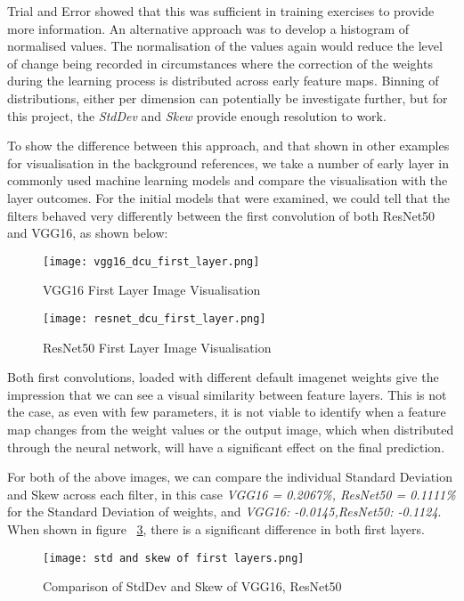 Trial and Error showed that this was sufficient in training exercises to provide more information. An alternative approach was to develop a histogram of normalised values. The normalisation of the values again would reduce the level of change being recorded in circumstances where the correction of the weights during the learning process is distributed across early feature maps. Binning of distributions, either per dimension can potentially be investigate further, but for this project, the \textit{StdDev} and \textit{Skew} provide enough resolution to work.

To show the difference between this approach, and that shown in other examples for visualisation in the background references, we take a number of early layer in commonly used machine learning models and compare the visualisation with the layer outcomes. For the initial models that were examined, we could tell that the filters behaved very differently between the first convolution of both ResNet50 and VGG16, as shown below:

\begin{figure}[!ht]
    \centering
    \texttt{[image: vgg16\_dcu\_first\_layer.png]}
    \caption{VGG16 First Layer Image Visualisation}
    \label{fig:vgg16_dcu_image}
\end{figure}

\begin{figure}[!ht]
    \centering
    \texttt{[image: resnet\_dcu\_first\_layer.png]}
    \caption{ResNet50 First Layer Image Visualisation}
    \label{fig:resnet50_dcu_image}
\end{figure}

Both first convolutions, loaded with different default imagenet weights give the impression that we can see a visual similarity between feature layers. This is not the case, as even with few parameters, it is not viable to identify when a feature map changes from the weight values or the output image, which when distributed through the neural network, will have a significant effect on the final prediction.

For both of the above images, we can compare the individual Standard Deviation and Skew across each filter, in this case \textit{VGG16 = 0.2067\%, ResNet50 = 0.1111\%} for the Standard Deviation of weights, and \textit{VGG16: -0.0145,ResNet50: -0.1124}. When shown in figure ~\ref{fig:firstlayermodelcomparison}, there is a significant difference in both first layers.

\begin{figure}[!ht]
    \centering
    \texttt{[image: std and skew of first layers.png]}
    \caption{Comparison of StdDev and Skew of VGG16, ResNet50}
    \label{fig:firstlayermodelcomparison}
\end{figure}

